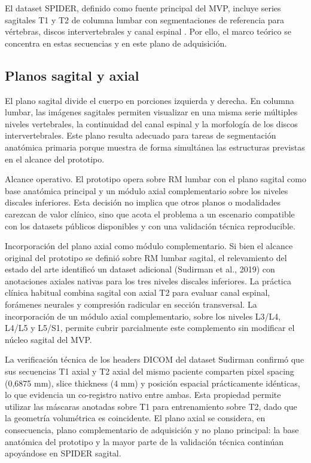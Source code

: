 El dataset SPIDER, definido como fuente principal del MVP, incluye series sagitales T1 y T2 de columna lumbar con segmentaciones de referencia para vértebras, discos intervertebrales y canal espinal \parencite{vandergraaf_spider_2024}. Por ello, el marco teórico se concentra en estas secuencias y en este plano de adquisición.

\subsection{Planos sagital y axial}

El plano sagital divide el cuerpo en porciones izquierda y derecha. En columna lumbar, las imágenes sagitales permiten visualizar en una misma serie múltiples niveles vertebrales, la continuidad del canal espinal y la morfología de los discos intervertebrales. Este plano resulta adecuado para tareas de segmentación anatómica primaria porque muestra de forma simultánea las estructuras previstas en el alcance del prototipo.

Alcance operativo. El prototipo opera sobre RM lumbar con el plano sagital como base anatómica principal y un módulo axial complementario sobre los niveles discales inferiores. Esta decisión no implica que otros planos o modalidades carezcan de valor clínico, sino que acota el problema a un escenario compatible con los datasets públicos disponibles y con una validación técnica reproducible.

Incorporación del plano axial como módulo complementario. Si bien el alcance original del prototipo se definió sobre RM lumbar sagital, el relevamiento del estado del arte identificó un dataset adicional (Sudirman et al., 2019) con anotaciones axiales nativas para los tres niveles discales inferiores. La práctica clínica habitual combina sagital con axial T2 para evaluar canal espinal, forámenes neurales y compresión radicular en sección transversal. La incorporación de un módulo axial complementario, sobre los niveles L3/L4, L4/L5 y L5/S1, permite cubrir parcialmente este complemento sin modificar el núcleo sagital del MVP.

La verificación técnica de los headers DICOM del dataset Sudirman confirmó que sus secuencias T1 axial y T2 axial del mismo paciente comparten pixel spacing (0,6875 mm), slice thickness (4 mm) y posición espacial prácticamente idénticas, lo que evidencia un co-registro nativo entre ambas. Esta propiedad permite utilizar las máscaras anotadas sobre T1 para entrenamiento sobre T2, dado que la geometría volumétrica es coincidente. El plano axial se considera, en consecuencia, plano complementario de adquisición y no plano principal: la base anatómica del prototipo y la mayor parte de la validación técnica continúan apoyándose en SPIDER sagital.

